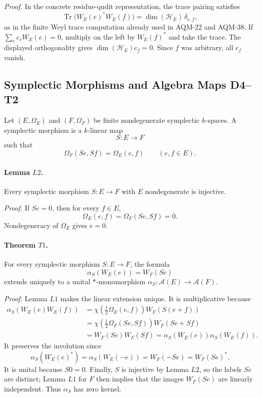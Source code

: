 \emph{Proof.}
In the concrete residue-qudit representation, the trace pairing satisfies
\[
  \operatorname{Tr}\bigl(W_E(e)^*W_E(f)\bigr)
  =
  \dim(\mathcal H_E)\,\delta_{e,f},
\]
as in the finite Weyl trace computation already used in AQM-22 and AQM-38.
If \(\sum_e c_eW_E(e)=0\), multiply on the left by \(W_E(f)^*\) and take the
trace.  The displayed orthogonality gives
\(\dim(\mathcal H_E)c_f=0\).  Since \(f\) was arbitrary, all \(c_f\) vanish.

\subsection{Symplectic Morphisms and Algebra Maps D4--T2}

Let \((E,\Omega_E)\) and \((F,\Omega_F)\) be finite nondegenerate symplectic
\(k\)-spaces.  A symplectic morphism is a \(k\)-linear map
\[
  S:E\to F
\]
such that
\[
  \Omega_F(Se,Sf)=\Omega_E(e,f)
  \qquad(e,f\in E).
\]

\paragraph{Lemma \(L2\).}
Every symplectic morphism \(S:E\to F\) with \(E\) nondegenerate is injective.

\emph{Proof.}
If \(Se=0\), then for every \(f\in E\),
\[
  \Omega_E(e,f)=\Omega_F(Se,Sf)=0.
\]
Nondegeneracy of \(\Omega_E\) gives \(e=0\).

\paragraph{Theorem \(T1\).}
For every symplectic morphism \(S:E\to F\), the formula
\[
  \alpha_S(W_E(e))=W_F(Se)
\]
extends uniquely to a unital \(*\)-monomorphism
\(\alpha_S:\mathcal A(E)\to\mathcal A(F)\).

\emph{Proof.}
Lemma \(L1\) makes the linear extension unique.  It is multiplicative because
\[
\begin{aligned}
  \alpha_S(W_E(e)W_E(f))
  &=
  \chi\!\left(\frac12\Omega_E(e,f)\right)W_F(S(e+f))\\
  &=
  \chi\!\left(\frac12\Omega_F(Se,Sf)\right)W_F(Se+Sf)\\
  &=
  W_F(Se)W_F(Sf)
  =
  \alpha_S(W_E(e))\alpha_S(W_E(f)).
\end{aligned}
\]
It preserves the involution since
\[
  \alpha_S(W_E(e)^*)=\alpha_S(W_E(-e))=W_F(-Se)=W_F(Se)^*.
\]
It is unital because \(S0=0\).  Finally, \(S\) is injective by Lemma \(L2\),
so the labels \(Se\) are distinct; Lemma \(L1\) for \(F\) then implies that
the images \(W_F(Se)\) are linearly independent.  Thus \(\alpha_S\) has zero
kernel.

